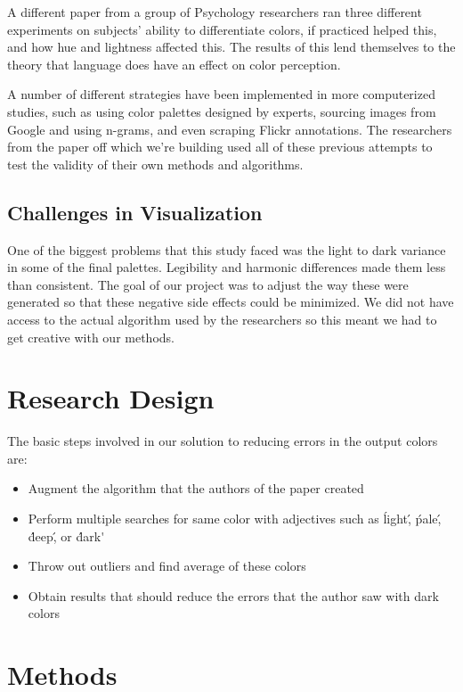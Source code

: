 \documentclass[journal]{vgtc}                %
\begin{document}
A different paper from a group of Psychology researchers ran three different experiments on subjects' ability to differentiate colors, if practiced helped this, and how hue and lightness affected this.
The results of this lend themselves to the theory that language does have an effect on color perception. \cite{ozgen}

A number of different strategies have been implemented in more computerized studies, such as using color palettes designed by experts, sourcing images from Google and using n-grams, and even scraping Flickr annotations.
The researchers from the paper off which we're building used all of these previous attempts to test the validity of their own methods and algorithms.


\subsection{Challenges in Visualization}
One of the biggest problems that this study faced was the light to dark variance in some of the final palettes.
Legibility and harmonic differences made them less than consistent.
The goal of our project was to adjust the way these were generated so that these negative side effects could be minimized.
We did not have access to the actual algorithm used by the researchers so this meant we had to get creative with our methods.


\section{Research Design}
The basic steps involved in our solution to reducing errors in the output colors are:
\begin{itemize}
  \item Augment the algorithm that the authors of the paper created
  \item Perform multiple searches for same color with adjectives such as \'light\', \'pale\', \'deep\', or \'dark\'
  \item Throw out outliers and find average of these colors
  \item Obtain results that should reduce the errors that the author saw with dark colors
\end{itemize}

\section{Methods}
\end{document}
